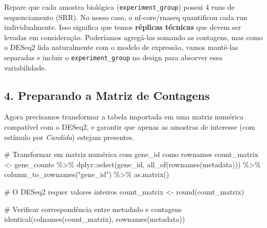 \documentclass[
  letterpaper,
  DIV=11,
  numbers=noendperiod]{scrreprt}
\newenvironment{Shaded}{\begin{snugshade}}{\end{snugshade}}
\newcommand{\CommentTok}[1]{\textcolor[rgb]{0.37,0.37,0.37}{#1}}
\newcommand{\FunctionTok}[1]{\textcolor[rgb]{0.28,0.35,0.67}{#1}}
\newcommand{\NormalTok}[1]{\textcolor[rgb]{0.00,0.23,0.31}{#1}}
\newcommand{\OtherTok}[1]{\textcolor[rgb]{0.00,0.23,0.31}{#1}}
\newcommand{\SpecialCharTok}[1]{\textcolor[rgb]{0.37,0.37,0.37}{#1}}
\newcommand{\StringTok}[1]{\textcolor[rgb]{0.13,0.47,0.30}{#1}}
\begin{document}
\begin{tcolorbox}[enhanced jigsaw, arc=.35mm, bottomrule=.15mm, bottomtitle=1mm, breakable, colback=white, colbacktitle=quarto-callout-note-color!10!white, colframe=quarto-callout-note-color-frame, coltitle=black, left=2mm, leftrule=.75mm, opacityback=0, opacitybacktitle=0.6, rightrule=.15mm, title=\textcolor{quarto-callout-note-color}{\faInfo}\hspace{0.5em}{Ponto Importante}, titlerule=0mm, toprule=.15mm, toptitle=1mm]

Repare que cada amostra biológica (\texttt{experiment\_group}) possui 4
runs de sequenciamento (SRR). No nosso caso, o nf-core/rnaseq
quantificou cada run individualmente. Isso significa que temos
\textbf{réplicas técnicas} que devem ser levadas em consideração.
Poderíamos agregá-las somando as contagens, mas como o DESeq2 lida
naturalmente com o modelo de expressão, vamos mantê-las separadas e
incluir o \texttt{experiment\_group} no design para absorver essa
variabilidade.

\end{tcolorbox}

\subsection{4. Preparando a Matriz de
Contagens}\label{preparando-a-matriz-de-contagens}

Agora precisamos transformar a tabela importada em uma matriz numérica
compatível com o DESeq2, e garantir que apenas as amostras de interesse
(com estímulo por \emph{Candida}) estejam presentes.

\begin{Shaded}
\begin{Highlighting}[]
\CommentTok{\# Transformar em matriz numérica com gene\_id como rownames}
\NormalTok{count\_matrix }\OtherTok{\textless{}{-}}\NormalTok{ gene\_counts }\SpecialCharTok{\%\textgreater{}\%}
\NormalTok{  dplyr}\SpecialCharTok{::}\FunctionTok{select}\NormalTok{(gene\_id, }\FunctionTok{all\_of}\NormalTok{(}\FunctionTok{rownames}\NormalTok{(metadata))) }\SpecialCharTok{\%\textgreater{}\%}
  \FunctionTok{column\_to\_rownames}\NormalTok{(}\StringTok{"gene\_id"}\NormalTok{) }\SpecialCharTok{\%\textgreater{}\%}
  \FunctionTok{as.matrix}\NormalTok{()}

\CommentTok{\# O DESeq2 requer valores inteiros}
\NormalTok{count\_matrix }\OtherTok{\textless{}{-}} \FunctionTok{round}\NormalTok{(count\_matrix)}

\CommentTok{\# Verificar correspondência entre metadado e contagens}
\FunctionTok{identical}\NormalTok{(}\FunctionTok{colnames}\NormalTok{(count\_matrix), }\FunctionTok{rownames}\NormalTok{(metadata))}
\end{Highlighting}
\end{Shaded}
\end{document}
